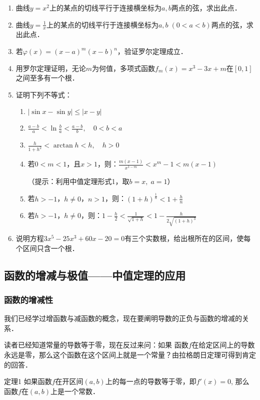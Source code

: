 \begin{ex}
\begin{enumerate}
    \item 曲线$y=x^2$上的某点的切线平行于连接横坐标为$a,b$两点的弦，求出此点．
    \item 曲线$y=\frac{1}{x}$上的某点的切线平行于连接横坐标为$a,b\;(0<a<b)$两点的弦，求出此点．
    \item 若$\varphi(x)=(x-a)^m(x-b)^n$，验证罗尔定理成立．
    \item 用罗尔定理证明，无论$m$为何值，多项式函数$f_m(x)=x^3-3x+m$在$[0, 1]$之间至多有一个根．
    \item 证明下列不等式：
\begin{enumerate}
    \item $|\sin x-\sin y|\le |x-y|$
    \item $\frac{a-b}{a}<\ln \frac{b}{a}<\frac{a-b}{b},\quad 0<b<a$
    \item $\frac{h}{1+h^2}<\arctan h<h,\quad h>0$
    \item 若$0<m<1$，且$x>1$，则：$\frac{m(x-1)}{x^{1-m}}<x^m-1<m(x-1)$
    
    （提示：利用中值定理形式1，取$b=x,\; a=1$）
    \item 若$h>-1$，$h\ne 0$，$n>1$，则：$(1+h)^{\tfrac{1}{n}}<1+\frac{h}{n}$
    \item 若$h>-1$，$h\ne 0$，则：$1-\frac{h}{2}<\frac{1}{\sqrt{1+h}}<1-\frac{h}{2\sqrt{(1+h)^3}}$
\end{enumerate}
\item 说明方程$3x^5-25x^3+60x-20=0$有三个实数根，给出根所在的区间，使每个区间只含一个根．
\end{enumerate}
\end{ex}

\subsection{函数的增减与极值——中值定理的应用}

\subsubsection{函数的增减性}

我们已经学过增函数与减函数的概念，现在要阐明导数的正负与函数的增减的关系．

读者已经知道常量的导数等于零，现在反过来问：如果
函数$f$在给定区间上的导数永远是零，那么这个函数在这个区间上就是一个常量？由拉格朗日定理可得到肯定的回答．

\begin{blk}
  {定理1} 如果函数$f$在开区间$(a,b)$上的每一点的导数等于零，即$f'(x)=0$, 那么函数$f$在$(a,b)$上是一个常数．  
\end{blk}

